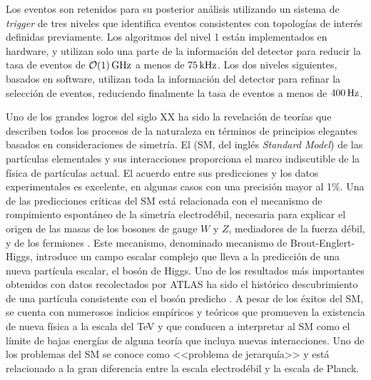 Los eventos son retenidos para su posterior análisis utilizando un sistema de
\emph{trigger} de tres niveles \cite{Aad:2012xs} que identifica eventos consistentes
con topologías de interés definidas previamente. Los algoritmos del nivel 1 están
implementados en hardware, y utilizan solo una parte de la información del detector para
reducir la tasa de eventos de $\unit[\mathcal{O}(1)]{GHz}$ a menos de $\unit[75]{kHz}$. Los dos niveles siguientes,
basados en software, utilizan toda la información del detector para refinar la selección
de eventos, reduciendo finalmente la tasa de eventos a menos de  $\unit[400]{Hz}$.

Uno de los grandes logros del siglo XX ha sido la revelación de teorías que
describen todos los procesos de la naturaleza en términos de principios
elegantes basados en consideraciones de simetría. El {\SM} (SM, del inglés \emph{Standard Model})
\cite{PhysRevLett.19.1264,PhysRev.127.965,Glashow1961579} de las partículas
elementales y sus interacciones proporciona el marco indiscutible de la física
de partículas actual. El acuerdo entre sus predicciones y los datos
experimentales es excelente, en algunas casos con una precisión mayor al 1\%.
Una de las predicciones críticas del SM está relacionada con el mecanismo de
rompimiento espontáneo de la simetría electrodébil, necesaria para explicar el
origen de las masas de los bosones de gauge $W$ y $Z$, mediadores de la fuerza
débil, y de los fermiones \cite{PhysRevLett.13.321,PhysRevLett.13.508}. Este
mecanismo, denominado mecanismo de Brout-Englert-Higgs, introduce un campo escalar complejo
que lleva a la predicción de
una nueva partícula escalar, el bosón de Higgs. Uno de los resultados más
importantes obtenidos con datos recolectados por ATLAS ha sido el histórico
descubrimiento de una partícula consistente con el bosón predicho \cite{Aad:2012tfa}.
A pesar de los éxitos del SM, se cuenta con numerosos
indicios empíricos y teóricos que promueven la existencia de nueva física a la
escala del TeV y que conducen a interpretar al SM como el límite de bajas
energías de alguna teoría que incluya nuevas interacciones.
Uno de los problemas del SM se conoce como <<problema de jerarquía>> y está
relacionado a la gran diferencia entre la escala electrodébil y la escala de Planck.

